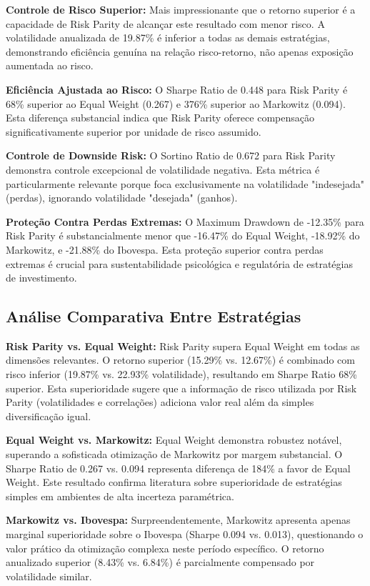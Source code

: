 \textbf{Controle de Risco Superior:} Mais impressionante que o retorno superior é a capacidade de Risk Parity de alcançar este resultado com menor risco. A volatilidade anualizada de 19.87\% é inferior a todas as demais estratégias, demonstrando eficiência genuína na relação risco-retorno, não apenas exposição aumentada ao risco.

\textbf{Eficiência Ajustada ao Risco:} O Sharpe Ratio de 0.448 para Risk Parity é 68\% superior ao Equal Weight (0.267) e 376\% superior ao Markowitz (0.094). Esta diferença substancial indica que Risk Parity oferece compensação significativamente superior por unidade de risco assumido.

\textbf{Controle de Downside Risk:} O Sortino Ratio de 0.672 para Risk Parity demonstra controle excepcional de volatilidade negativa. Esta métrica é particularmente relevante porque foca exclusivamente na volatilidade "indesejada" (perdas), ignorando volatilidade "desejada" (ganhos).

\textbf{Proteção Contra Perdas Extremas:} O Maximum Drawdown de -12.35\% para Risk Parity é substancialmente menor que -16.47\% do Equal Weight, -18.92\% do Markowitz, e -21.88\% do Ibovespa. Esta proteção superior contra perdas extremas é crucial para sustentabilidade psicológica e regulatória de estratégias de investimento.

\subsection{Análise Comparativa Entre Estratégias}

\textbf{Risk Parity vs. Equal Weight:} Risk Parity supera Equal Weight em todas as dimensões relevantes. O retorno superior (15.29\% vs. 12.67\%) é combinado com risco inferior (19.87\% vs. 22.93\% volatilidade), resultando em Sharpe Ratio 68\% superior. Esta superioridade sugere que a informação de risco utilizada por Risk Parity (volatilidades e correlações) adiciona valor real além da simples diversificação igual.

\textbf{Equal Weight vs. Markowitz:} Equal Weight demonstra robustez notável, superando a sofisticada otimização de Markowitz por margem substancial. O Sharpe Ratio de 0.267 vs. 0.094 representa diferença de 184\% a favor de Equal Weight. Este resultado confirma literatura sobre superioridade de estratégias simples em ambientes de alta incerteza paramétrica.

\textbf{Markowitz vs. Ibovespa:} Surpreendentemente, Markowitz apresenta apenas marginal superioridade sobre o Ibovespa (Sharpe 0.094 vs. 0.013), questionando o valor prático da otimização complexa neste período específico. O retorno anualizado superior (8.43\% vs. 6.84\%) é parcialmente compensado por volatilidade similar.

